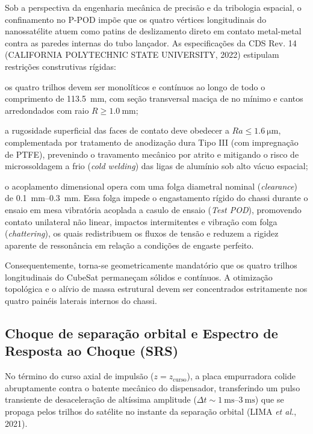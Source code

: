 Sob a perspectiva da engenharia mecânica de precisão e da tribologia espacial, o confinamento no P-POD impõe que os quatro vértices longitudinais do nanossatélite atuem como patins de deslizamento direto em contato metal-metal contra as paredes internas do tubo lançador. As especificações da CDS Rev. 14 (CALIFORNIA POLYTECHNIC STATE UNIVERSITY, 2022) estipulam restrições construtivas rígidas:
\begin{alineas}
  \item os quatro trilhos devem ser monolíticos e contínuos ao longo de todo o comprimento de \SI{113.5}{\milli\metre}, com seção transversal maciça de no mínimo \rail{} e cantos arredondados com raio $R \ge \SI{1.0}{\milli\metre}$;
  \item a rugosidade superficial das faces de contato deve obedecer a $Ra \le \SI{1.6}{\micro\metre}$, complementada por tratamento de anodização dura Tipo III (com impregnação de PTFE), prevenindo o travamento mecânico por atrito e mitigando o risco de microssoldagem a frio (\textit{cold welding}) das ligas de alumínio sob alto vácuo espacial;
  \item o acoplamento dimensional opera com uma folga diametral nominal (\textit{clearance}) de \SIrange{0.1}{0.3}{\milli\metre}. Essa folga impede o engastamento rígido do chassi durante o ensaio em mesa vibratória acoplada a casulo de ensaio (\textit{Test POD}), promovendo contato unilateral não linear, impactos intermitentes e vibração com folga (\textit{chattering}), os quais redistribuem os fluxos de tensão e reduzem a rigidez aparente de ressonância em relação a condições de engaste perfeito.
\end{alineas}

Consequentemente, torna-se geometricamente mandatório que os quatro trilhos longitudinais do CubeSat permaneçam sólidos e contínuos. A otimização topológica e o alívio de massa estrutural devem ser concentrados estritamente nos quatro painéis laterais internos do chassi.

\subsection{Choque de separação orbital e Espectro de Resposta ao Choque (SRS)}
\label{subsec:srs-teoria}

No término do curso axial de impulsão ($z = z_{\text{curso}}$), a placa empurradora colide abruptamente contra o batente mecânico do dispensador, transferindo um pulso transiente de desaceleração de altíssima amplitude ($\Delta t \sim \SIrange{1}{3}{\milli\second}$) que se propaga pelos trilhos do satélite no instante da separação orbital (LIMA \textit{et al.}, 2021). 

